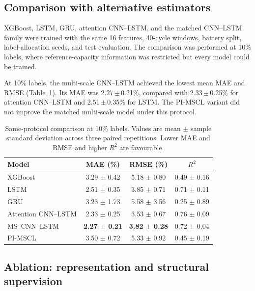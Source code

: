 \documentclass[pdflatex,sn-mathphys-num]{sn-jnl}
\begin{document}


\subsection{Comparison with alternative estimators}
\label{subsec:comparative_results}

XGBoost, LSTM, GRU, attention CNN--LSTM, and the matched CNN--LSTM family were trained with the same 16 features, 40-cycle windows, battery split, label-allocation seeds, and test evaluation. The comparison was performed at 10\% labels, where reference-capacity information was restricted but every model could be trained.

At 10\% labels, the multi-scale CNN--LSTM achieved the lowest mean MAE and RMSE (Table~\ref{tab:baseline_comparison}). Its MAE was 2.27\,$\pm$\,0.21\%, compared with 2.33\,$\pm$\,0.25\% for attention CNN--LSTM and 2.51\,$\pm$\,0.35\% for LSTM. The PI-MSCL variant did not improve the matched multi-scale model under this protocol.

\begin{table}[t]
\caption{Same-protocol comparison at 10\% labels. Values are mean $\pm$ sample standard deviation across three paired repetitions. Lower MAE and RMSE and higher $R^2$ are favourable.}
\label{tab:baseline_comparison}
\centering
\small
\begin{tabular*}{\textwidth}{@{\extracolsep{\fill}}lccc@{}}
\toprule
Model & MAE (\%) & RMSE (\%) & $R^2$ \\
\midrule
XGBoost & 3.29 $\pm$ 0.42 & 5.18 $\pm$ 0.80 & 0.49 $\pm$ 0.16 \\
LSTM & 2.51 $\pm$ 0.35 & 3.85 $\pm$ 0.71 & 0.71 $\pm$ 0.11 \\
GRU & 3.23 $\pm$ 1.73 & 5.58 $\pm$ 3.56 & 0.25 $\pm$ 0.89 \\
Attention CNN--LSTM & 2.33 $\pm$ 0.25 & 3.53 $\pm$ 0.67 & 0.76 $\pm$ 0.09 \\
MS--CNN--LSTM & \textbf{2.27 $\pm$ 0.21} & \textbf{3.82 $\pm$ 0.28} & 0.72 $\pm$ 0.04 \\
PI-MSCL & 3.50 $\pm$ 0.72 & 5.33 $\pm$ 0.92 & 0.45 $\pm$ 0.19 \\
\bottomrule
\end{tabular*}
\end{table}

\subsection{Ablation: representation and structural supervision}
\label{subsec:ablation}
\end{document}

